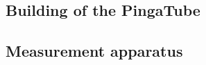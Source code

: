\subsection{Building of the PingaTube}
\label{sec:building-pingatube}

\subsection{Measurement apparatus}
\label{sec:meas-appar}

